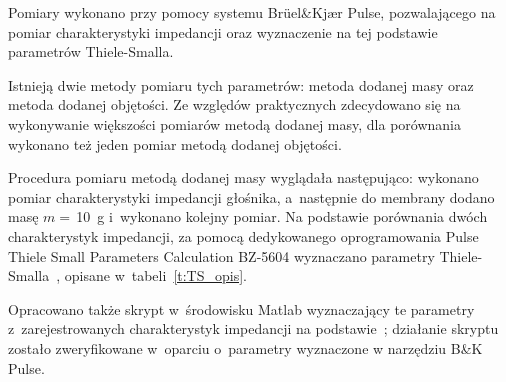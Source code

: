 \documentclass[12pt]{oska}
\begin{document}
	Pomiary wykonano przy pomocy systemu Brüel\&Kjær Pulse, pozwalającego na pomiar charakterystyki impedancji oraz wyznaczenie na tej podstawie parametrów Thiele-Smalla.
	
	Istnieją dwie metody pomiaru tych parametrów: metoda dodanej masy oraz metoda dodanej objętości. Ze względów praktycznych zdecydowano się na wykonywanie większości pomiarów metodą dodanej masy, dla porównania wykonano też jeden pomiar metodą dodanej objętości.
	
	Procedura pomiaru metodą dodanej masy wyglądała następująco: wykonano pomiar charakterystyki impedancji głośnika, a~następnie do membrany dodano masę $m=\,$\SI{10}{\gram} i~wykonano kolejny pomiar. Na podstawie porównania dwóch charakterystyk impedancji, za pomocą dedykowanego oprogramowania Pulse Thiele Small Parameters Calculation BZ-5604 wyznaczano parametry Thiele-Smalla~\cite{BK_pulse_TS}, opisane w~tabeli~\ref{t:TS_opis}.
	
	Opracowano także skrypt w~środowisku Matlab wyznaczający te parametry z~zarejestrowanych charakterystyk impedancji na podstawie~\cite{dobrucki}; działanie skryptu zostało zweryfikowane w~oparciu o~parametry wyznaczone w narzędziu B\&K Pulse.
	
\end{document}
